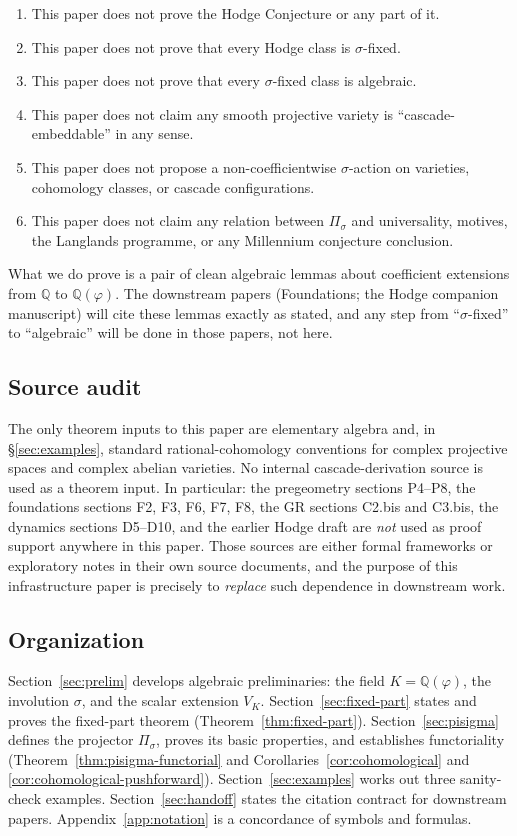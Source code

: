 \documentclass[11pt, a4paper]{amsart}
\theoremstyle{definition}
\newcommand{\Q}{\mathbb{Q}}
\begin{document}
\begin{enumerate}
\item This paper does not prove the Hodge Conjecture or any part
  of it.
\item This paper does not prove that every Hodge class is
  $\sigma$-fixed.
\item This paper does not prove that every $\sigma$-fixed class is
  algebraic.
\item This paper does not claim any smooth projective variety is
  ``cascade-embeddable'' in any sense.
\item This paper does not propose a non-coefficientwise
  $\sigma$-action on varieties, cohomology classes, or cascade
  configurations.
\item This paper does not claim any relation between $\Pi_\sigma$
  and universality, motives, the Langlands programme, or any
  Millennium conjecture conclusion.
\end{enumerate}

What we do prove is a pair of clean algebraic lemmas about
coefficient extensions from $\Q$ to $\Q(\varphi)$. The downstream
papers (Foundations; the Hodge companion manuscript) will cite
these lemmas exactly as stated, and any step from
``$\sigma$-fixed'' to ``algebraic'' will be done in those papers,
not here.

\subsection{Source audit}

The only theorem inputs to this paper are elementary algebra and,
in \S\ref{sec:examples}, standard rational-cohomology conventions
for complex projective spaces and complex abelian varieties. No
internal cascade-derivation source is used as a theorem input. In
particular: the pregeometry sections P4--P8, the foundations
sections F2, F3, F6, F7, F8, the GR sections C2.bis and C3.bis,
the dynamics sections D5--D10, and the earlier Hodge draft are
\emph{not} used as proof support anywhere in this paper. Those
sources are either formal frameworks or exploratory notes in their
own source documents, and the purpose of this infrastructure paper
is precisely to \emph{replace} such dependence in downstream work.

\subsection{Organization}

Section~\ref{sec:prelim} develops algebraic preliminaries: the
field $K = \Q(\varphi)$, the involution $\sigma$, and the scalar
extension $V_K$. Section~\ref{sec:fixed-part} states and proves
the fixed-part theorem (Theorem~\ref{thm:fixed-part}).
Section~\ref{sec:pisigma} defines the projector $\Pi_\sigma$,
proves its basic properties, and establishes functoriality
(Theorem~\ref{thm:pisigma-functorial} and
Corollaries~\ref{cor:cohomological} and
\ref{cor:cohomological-pushforward}). Section~\ref{sec:examples}
works out three sanity-check examples.
Section~\ref{sec:handoff} states the citation contract for
downstream papers. Appendix~\ref{app:notation} is a concordance of
symbols and formulas.
\end{document}
